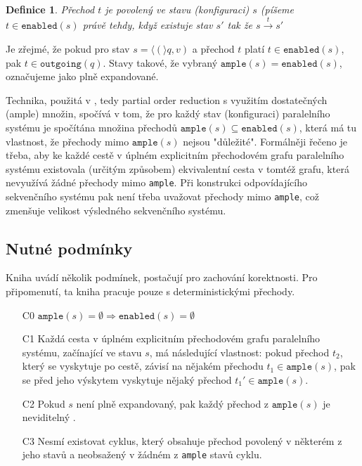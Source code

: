 \documentclass[10pt,a4paper,notitlepage]{report}
\newtheorem{definition}{Definice}
\newcommand{\tuple}[1]{\langle #1 \rangle}
\begin{document}
\begin{definition}
Přechod $t$ je povolený ve stavu (konfiguraci) $s$ (píšeme $t \in \texttt{enabled}(s)$ právě tehdy, když existuje stav $s'$ tak že $s \xrightarrow{t} s'$
\end{definition}
Je zřejmé, že pokud pro stav $s = \tuple(q, v)$ a přechod $t$ platí $t \in \texttt{enabled}(s)$, pak $t \in \texttt{outgoing}(q)$. Stavy takové, že vybraný $\texttt{ample}(s) = \texttt{enabled}(s)$, označujeme jako plně expandované.

Technika, použitá v \cite{CLARKE}, tedy partial order reduction s využitím dostatečných (ample) množin, spočívá v tom, že pro každý stav (konfiguraci) paralelního systému je spočítána množina přechodů $\texttt{ample}(s) \subseteq \texttt{enabled}(s)$, která má tu vlastnost, že přechody mimo $\texttt{ample}(s)$ nejsou "důležité". Formálněji řečeno je třeba, aby ke každé cestě v úplném explicitním přechodovém grafu paralelního systému existovala (určitým způsobem) ekvivalentní cesta v tomtéž grafu, která nevyužívá žádné přechody mimo \texttt{ample}. Při konstrukci odpovídajícího sekvenčního systému pak není třeba uvažovat přechody mimo \texttt{ample}, což zmenšuje velikost výsledného sekvenčního systému.

\subsection{Nutné podmínky}
Kniha \cite{CLARKE} uvádí několik podmínek, postačují pro zachování korektnosti. Pro připomenutí, ta kniha pracuje pouze s deterministickými přechody. 

\begin{enumerate}
\item[C0] $\texttt{ample}(s) = \emptyset \Rightarrow \texttt{enabled}(s) = \emptyset$
\item[C1] Každá cesta v úplném explicitním přechodovém grafu paralelního systému, začínající ve stavu $s$, má následující vlastnost: pokud přechod $t_2$, který se vyskytuje po cestě, závisí na nějakém přechodu $t_1 \in \texttt{ample}(s)$, pak se před jeho výskytem vyskytuje nějaký přechod $t_1' \in \texttt{ample}(s)$.
\item[C2] Pokud $s$ není plně expandovaný, pak každý přechod z $\texttt{ample}(s)$ je neviditelný .
\item[C3] Nesmí existovat cyklus, který obsahuje přechod povolený v některém z jeho stavů a neobsažený v žádném z \texttt{ample} stavů cyklu.
\end{enumerate}
\end{document}
